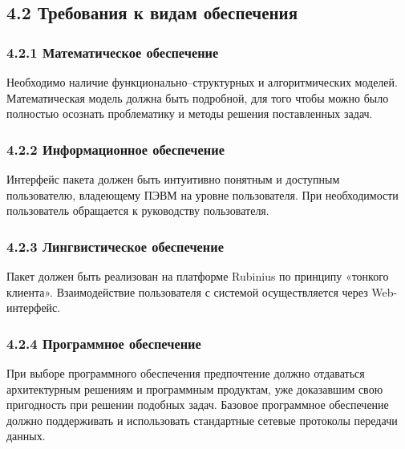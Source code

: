 \subsection*{4.2 Требования к видам обеспечения}
\subsubsection*{4.2.1 Математическое обеспечение}
Необходимо наличие функционально--структурных и алгоритмических
моделей. Математическая модель должна быть подробной, для того чтобы
можно было полностью осознать проблематику и методы решения
поставленных задач.

\subsubsection*{4.2.2 Информационное обеспечение}
Интерфейс пакета должен быть интуитивно понятным и доступным
пользователю, владеющему ПЭВМ на уровне пользователя. При
необходимости пользователь обращается к руководству пользователя. 

\subsubsection*{4.2.3 Лингвистическое обеспечение}
Пакет должен быть реализован на платформе Rubinius по принципу
«тонкого клиента». Взаимодействие пользователя с системой
осуществляется через Web-интерфейс.

\subsubsection*{4.2.4 Программное обеспечение}
При выборе программного обеспечения предпочтение должно отдаваться
архитектурным решениям и программным продуктам, уже доказавшим свою
пригодность при решении подобных задач. Базовое программное
обеспечение должно поддерживать и использовать стандартные сетевые
протоколы передачи данных.

